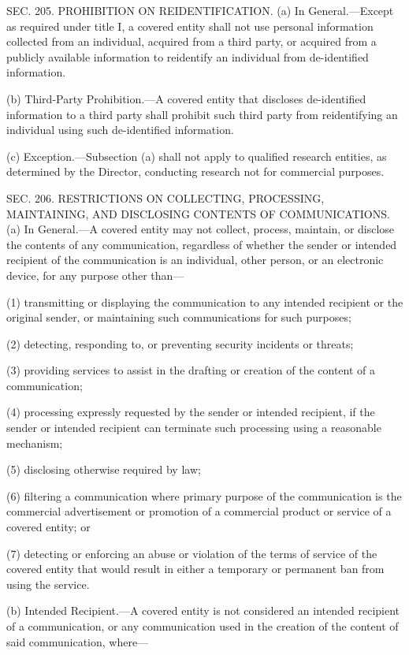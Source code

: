 SEC. 205. PROHIBITION ON REIDENTIFICATION.
(a) In General.—Except as required under title I, a covered entity shall not use personal information collected from an individual, acquired from a third party, or acquired from a publicly available information to reidentify an individual from de-identified information.

(b) Third-Party Prohibition.—A covered entity that discloses de-identified information to a third party shall prohibit such third party from reidentifying an individual using such de-identified information.

(c) Exception.—Subsection (a) shall not apply to qualified research entities, as determined by the Director, conducting research not for commercial purposes.


SEC. 206. RESTRICTIONS ON COLLECTING, PROCESSING, MAINTAINING, AND DISCLOSING CONTENTS OF COMMUNICATIONS.
(a) In General.—A covered entity may not collect, process, maintain, or disclose the contents of any communication, regardless of whether the sender or intended recipient of the communication is an individual, other person, or an electronic device, for any purpose other than—

(1) transmitting or displaying the communication to any intended recipient or the original sender, or maintaining such communications for such purposes;

(2) detecting, responding to, or preventing security incidents or threats;

(3) providing services to assist in the drafting or creation of the content of a communication;

(4) processing expressly requested by the sender or intended recipient, if the sender or intended recipient can terminate such processing using a reasonable mechanism;

(5) disclosing otherwise required by law;

(6) filtering a communication where primary purpose of the communication is the commercial advertisement or promotion of a commercial product or service of a covered entity; or

(7) detecting or enforcing an abuse or violation of the terms of service of the covered entity that would result in either a temporary or permanent ban from using the service.

(b) Intended Recipient.—A covered entity is not considered an intended recipient of a communication, or any communication used in the creation of the content of said communication, where—

